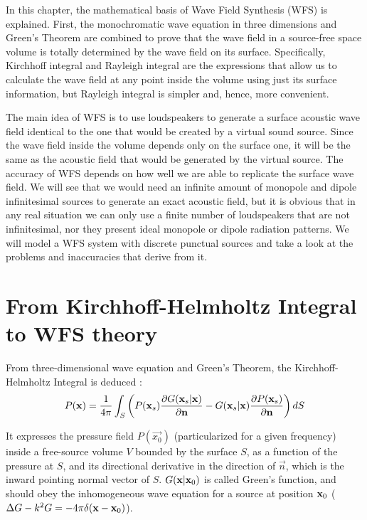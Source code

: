 In this chapter, the mathematical basis of Wave Field Synthesis (WFS) is explained. First, the monochromatic wave equation in three dimensions and Green's Theorem are combined to prove that the wave field in a source-free space volume is totally determined by the wave field on its surface. Specifically, Kirchhoff integral and Rayleigh integral are the expressions that allow us to calculate the wave field at any point inside the volume using just its surface information, but Rayleigh integral is simpler and, hence, more convenient. %

The main idea of WFS is to use loudspeakers to generate a surface acoustic wave field identical to the one that would be created by a virtual sound source. Since the wave field inside the volume depends only on the surface one, it will be the same as the acoustic field that would be generated by the virtual source. The accuracy of WFS depends on how well we are able to replicate the surface wave field. We will see that we would need an infinite amount of monopole and dipole infinitesimal sources to generate an exact acoustic field, but it is obvious that in any real situation we can only use a finite number of loudspeakers that are not infinitesimal, nor they present ideal monopole or dipole radiation patterns. We will model a WFS system with discrete punctual sources and take a look at the problems and inaccuracies that derive from it.

\section{From Kirchhoff-Helmholtz Integral to WFS theory}
From three-dimensional wave equation and Green's Theorem, the Kirchhoff-Helmholtz Integral is deduced \cite{BerkhoutSeismic} \cite{Verheijen}:
\begin{equation}
P(\PosTheo) = \frac{1}{4\pi} \int_{S} \left(P(\PosTheo[surface])\frac{\partial G(\PosTheo[surface]\vert \PosTheo)}{\partial \mathbf{n}} - G(\PosTheo[surface]\vert \PosTheo) \frac{\partial P(\PosTheo[surface])}{\partial \mathbf{n}} \right) dS
\label{KirchhoffHelmholtz}
\end{equation}

It expresses the pressure field $P(\vec{x_0})$ (particularized for a given frequency) inside a free-source volume $V$ bounded by the surface $S$, as a function of the pressure at $S$, and its directional derivative in the direction of $\vec{n}$, which is the inward pointing normal vector of $S$. $G(\PosTheo \vert \PosTheo_0)$ is called Green's function, and should obey the inhomogeneous wave equation for a source at position $\PosTheo_0$ ($\Delta G - k^2 G = -4\pi\delta(\PosTheo - \PosTheo_0)$).

